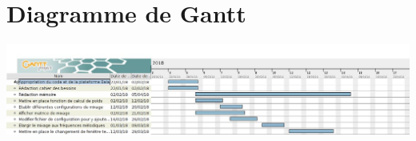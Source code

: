 \documentclass{article}
\begin{document}
\section{Diagramme de Gantt}
\includegraphics[scale=0.35]{DiagrammeAnalyseBesoins.jpg}

\end{document}
